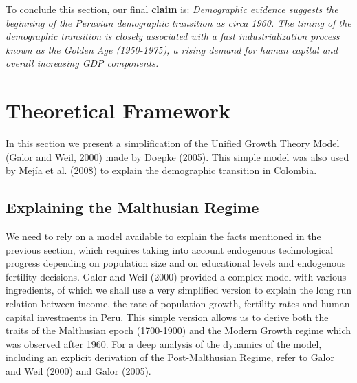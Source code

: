 \documentclass[12pt]{article}%
\begin{document}
To conclude this section, our final \textbf{claim} is: \emph{Demographic evidence suggests the beginning of the Peruvian demographic transition as circa 1960. The timing of the demographic transition is closely associated with a fast industrialization process known as the Golden Age (1950-1975), a rising demand for human capital and overall increasing GDP components.}
\section{Theoretical Framework}
In this section we present a simplification of the Unified Growth Theory Model (Galor and Weil, 2000) made by Doepke (2005). This simple model was also used by Mej\'ia et al. (2008) to explain the demographic transition in Colombia.

\subsection{Explaining the Malthusian Regime}
We need to rely on a model available to explain the facts mentioned in the previous section, which requires taking into account endogenous technological progress depending on population size and on educational levels and endogenous fertility decisions. Galor and Weil (2000) provided a complex model with various ingredients, of which we shall use a very simplified version to explain the long run relation between income, the rate of population growth, fertility rates and human capital investments in Peru. This simple version allows us to derive both the traits of the Malthusian epoch (1700-1900) and the Modern Growth regime which was observed after 1960. For a deep analysis of the dynamics of the model, including an explicit derivation of the Post-Malthusian Regime, refer to Galor and Weil (2000) and Galor (2005).
\end{document}

